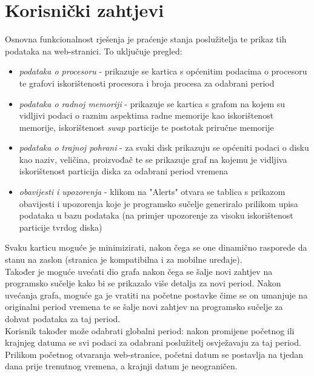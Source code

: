 \documentclass[zavrsnirad]{fer}
\begin{document}
\section{Korisnički zahtjevi}
Osnovna funkcionalnost rješenja je praćenje stanja poslužitelja te prikaz tih podataka na web-stranici.
To uključuje pregled:
\begin{itemize}
	\item \textit{podataka o procesoru} - prikazuje se kartica s općenitim podacima o procesoru te grafovi iskorištenosti procesora i broja procesa za odabrani period
	\item \textit{podataka o radnoj memoriji} - prikazuje se kartica s grafom na kojem su vidljivi podaci o raznim aspektima radne memorije kao iskorištenost memorije, iskorištenost \textit{swap} particije te postotak priručne memorije
	\item \textit{podataka o trajnoj pohrani} - za svaki disk prikazuju se općeniti podaci o disku kao naziv, veličina, proizvođač te se prikazuje graf na kojemu je vidljiva iskorištenost particija diska za odabrani period vremena
	\item \textit{obavijesti i upozorenja} - klikom na "Alerts" otvara se tablica s prikazom obavijesti i upozorenja koje je programsko sučelje generiralo prilikom upisa podataka u bazu podataka (na primjer upozorenje za visoku iskorištenost particije tvrdog diska)
\end{itemize}
Svaku karticu moguće je minimizirati, nakon čega se one dinamično rasporede da stanu na zaslon (stranica je kompatibilna i za mobilne uređaje).
\\Također je moguće uvećati dio grafa nakon čega se šalje novi zahtjev na programsko sučelje kako bi se prikazalo više detalja za novi period. Nakon uvećanja grafa, moguće ga je vratiti na početne postavke čime se on umanjuje na originalni period vremena te se šalje novi zahtjev na programsko sučelje za dohvat podataka za taj period.
\\Korisnik također može odabrati globalni period: nakon promijene početnog ili krajnjeg datuma se svi podaci za odabrani poslužitelj osvježavaju za taj period. Prilikom početnog otvaranja web-stranice, početni datum se postavlja na tjedan dana prije trenutnog vremena, a krajnji datum je neograničen.
\end{document}
